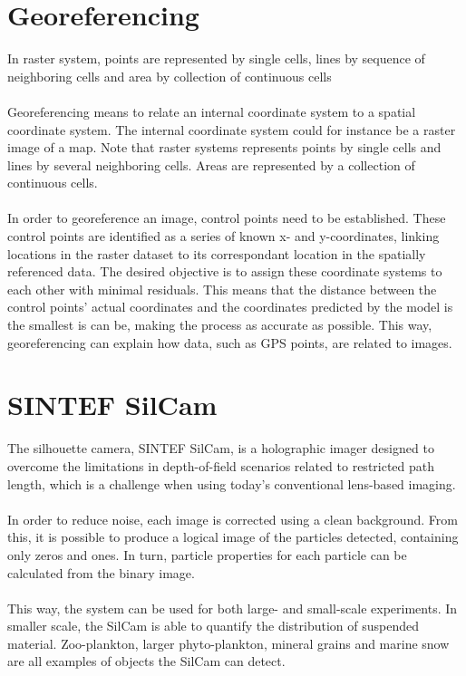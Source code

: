 \vspace{1.3cm}
\section{Georeferencing}
In raster system, points are represented by single cells, lines by sequence of neighboring cells and area by collection of continuous cells
\\\\
Georeferencing means to relate an internal coordinate system to a spatial coordinate system. The internal coordinate system could for instance be a raster image of a map. 
Note that raster systems represents points by single cells and lines by several neighboring cells. Areas are represented by a collection of continuous cells. 
\\\\
In order to georeference an image, control points need to be established. These control points are identified as a series of known x- and y-coordinates, linking locations in the raster dataset to its correspondant location in the spatially referenced data. The desired objective is to assign these coordinate systems to each other with minimal residuals. This means that the distance between the control points’ actual coordinates and the coordinates predicted by the model is the smallest is can be, making the process as accurate as possible. This way, georeferencing can explain how data, such as GPS points, are related to images.

\vspace{1.3cm}
\section{SINTEF SilCam}
The silhouette camera, SINTEF SilCam, is a holographic imager designed to overcome the limitations in depth-of-field scenarios related to restricted path length, which is a challenge when using today's conventional lens-based imaging. 
\\\\
In order to reduce noise, each image is corrected using a clean background. From this, it is possible to produce a logical image of the particles detected, containing only zeros and ones. In turn, particle properties for each particle can be calculated from the binary image.
\\\\
This way, the system can be used for both large- and small-scale experiments. In smaller scale, the SilCam is able to quantify the distribution of suspended material. Zoo-plankton, larger phyto-plankton, mineral grains and marine snow are all examples of objects the SilCam can detect. 


